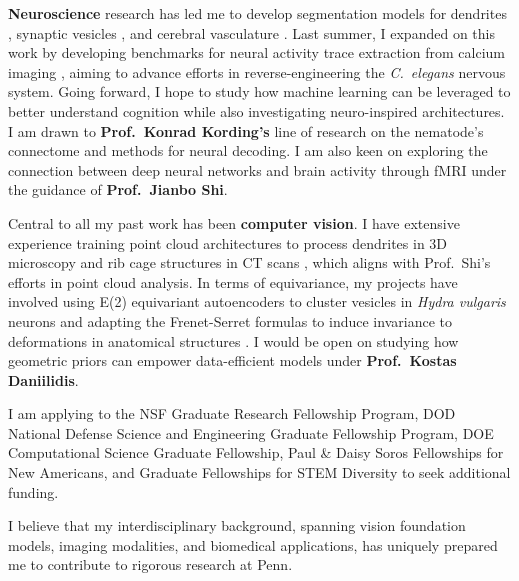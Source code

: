 \documentclass[letterpaper,11pt]{article}
\begin{document}
\textbf{Neuroscience} research has led me to develop segmentation models for dendrites , synaptic vesicles , and cerebral vasculature . Last summer, I expanded on this work by developing benchmarks for neural activity trace extraction from calcium imaging , aiming to advance efforts in reverse-engineering the \textit{C.\ elegans} nervous system. Going forward, I hope to study how machine learning can be leveraged to better understand cognition while also investigating neuro-inspired architectures. I am drawn to \textbf{Prof.\ Konrad Kording’s} line of research on the nematode’s connectome and methods for neural decoding. I am also keen on exploring the connection between deep neural networks and brain activity through fMRI under the guidance of \textbf{Prof.\ Jianbo Shi}.

Central to all my past work has been \textbf{computer vision}. I have extensive experience training point cloud architectures to process dendrites in 3D microscopy  and rib cage structures in CT scans , which aligns with Prof.\ Shi’s efforts in point cloud analysis. In terms of equivariance, my projects have involved using E(2) equivariant autoencoders to cluster vesicles in \textit{Hydra vulgaris} neurons  and adapting the Frenet-Serret formulas to induce invariance to deformations in anatomical structures . I would be open on studying how geometric priors can empower data-efficient models under \textbf{Prof.\ Kostas Daniilidis}.


I am applying to the NSF Graduate Research Fellowship Program, DOD National Defense Science and Engineering Graduate Fellowship Program, DOE Computational Science Graduate Fellowship, Paul \& Daisy Soros Fellowships for New Americans, and Graduate Fellowships for STEM Diversity to seek additional funding.

I believe that my interdisciplinary background, spanning vision foundation models, imaging modalities, and biomedical applications, has uniquely prepared me to contribute to rigorous research at Penn.
\end{document}
